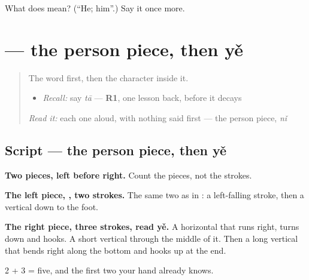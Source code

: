 \begin{tcolorbox}[breakable,colback=teal!4,colframe=teal!35!black,title={Before you move on}]
What does  mean? (\textquotedblleft{}He; him\textquotedblright{}.) Say it once more.
\end{tcolorbox}
\section[\texorpdfstring{\zh{他} (tā)}{他 (tā)}]{ — the person piece, then yě}

\label{lesson:ZH-W31-ta}



\begin{quote}
The word first, then the character inside it.

\begin{itemize}
\raggedright
  \item \emph{Recall:} say \emph{tā} — \textbf{R1}, one lesson back, before it decays
\end{itemize}

\begin{quote}
 
\end{quote}

\emph{Read it:} each one aloud, with nothing said first — the person piece, \emph{nǐ}
\end{quote}

\subsection*{Script — the person piece, then yě}

\begin{quote}
\end{quote}

\textbf{Two pieces, left before right.} Count the pieces, not the strokes.

\textbf{The left piece, , two strokes.} The same two as in : a left-falling stroke, then a vertical down to the foot.

\textbf{The right piece, three strokes, read yě.} A horizontal that runs right, turns down and hooks. A short vertical through the middle of it. Then a long vertical that bends right along the bottom and hooks up at the end.

2 + 3 = five, and the first two your hand already knows.

